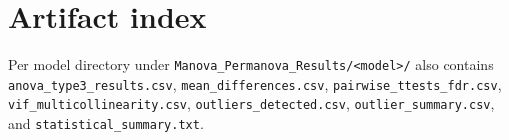 \documentclass[11pt]{article}
\begin{document}
\appendix

\section{Artifact index}

Per model directory under \texttt{Manova\_Permanova\_Results/<model>/} also contains \texttt{anova\_type3\_results.csv}, \texttt{mean\_differences.csv}, \texttt{pairwise\_ttests\_fdr.csv}, \texttt{vif\_multicollinearity.csv}, \texttt{outliers\_detected.csv}, \texttt{outlier\_summary.csv}, and \texttt{statistical\_summary.txt}.
\end{document}
